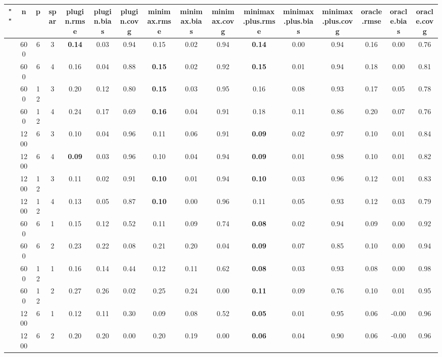 \begin{table}[ht]
\centering
\begin{tabular}{||c|ccc||ccc|ccc|ccc|ccc}
  \hline
\hline
"" & n & p & spar & plugin.rmse & plugin.bias & plugin.covg & minimax.rmse & minimax.bias & minimax.covg & minimax.plus.rmse & minimax.plus.bias & minimax.plus.covg & oracle.rmse & oracle.bias & oracle.covg \\ 
  \hline
 & 600 & 6 & 3 & \bf 0.14 & 0.03 & 0.94 & 0.15 & 0.02 & 0.94 & \bf 0.14 & 0.00 & 0.94 & 0.16 & 0.00 & 0.76 \\ 
   & 600 & 6 & 4 & 0.16 & 0.04 & 0.88 & \bf 0.15 & 0.02 & 0.92 & \bf 0.15 & 0.01 & 0.94 & 0.18 & 0.00 & 0.81 \\ 
   & 600 & 12 & 3 & 0.20 & 0.12 & 0.80 & \bf 0.15 & 0.03 & 0.95 & 0.16 & 0.08 & 0.93 & 0.17 & 0.05 & 0.78 \\ 
   & 600 & 12 & 4 & 0.24 & 0.17 & 0.69 & \bf 0.16 & 0.04 & 0.91 & 0.18 & 0.11 & 0.86 & 0.20 & 0.07 & 0.76 \\ 
   & 1200 & 6 & 3 & 0.10 & 0.04 & 0.96 & 0.11 & 0.06 & 0.91 & \bf 0.09 & 0.02 & 0.97 & 0.10 & 0.01 & 0.84 \\ 
   & 1200 & 6 & 4 & \bf 0.09 & 0.03 & 0.96 & 0.10 & 0.04 & 0.94 & \bf 0.09 & 0.01 & 0.98 & 0.10 & 0.01 & 0.82 \\ 
   & 1200 & 12 & 3 & 0.11 & 0.02 & 0.91 & \bf 0.10 & 0.01 & 0.94 & \bf 0.10 & 0.03 & 0.96 & 0.12 & 0.01 & 0.83 \\ 
   & 1200 & 12 & 4 & 0.13 & 0.05 & 0.87 & \bf 0.10 & 0.00 & 0.96 & 0.11 & 0.05 & 0.93 & 0.12 & 0.03 & 0.79 \\ 
   \hline
 & 600 & 6 & 1 & 0.15 & 0.12 & 0.52 & 0.11 & 0.09 & 0.74 & \bf 0.08 & 0.02 & 0.94 & 0.09 & 0.00 & 0.92 \\ 
   & 600 & 6 & 2 & 0.23 & 0.22 & 0.08 & 0.21 & 0.20 & 0.04 & \bf 0.09 & 0.07 & 0.85 & 0.10 & 0.00 & 0.94 \\ 
   & 600 & 12 & 1 & 0.16 & 0.14 & 0.44 & 0.12 & 0.11 & 0.62 & \bf 0.08 & 0.03 & 0.93 & 0.08 & 0.00 & 0.98 \\ 
   & 600 & 12 & 2 & 0.27 & 0.26 & 0.02 & 0.25 & 0.24 & 0.00 & \bf 0.11 & 0.09 & 0.76 & 0.10 & 0.01 & 0.95 \\ 
   & 1200 & 6 & 1 & 0.12 & 0.11 & 0.30 & 0.09 & 0.08 & 0.52 & \bf 0.05 & 0.01 & 0.95 & 0.06 & -0.00 & 0.96 \\ 
   & 1200 & 6 & 2 & 0.20 & 0.20 & 0.00 & 0.20 & 0.19 & 0.00 & \bf 0.06 & 0.04 & 0.90 & 0.06 & -0.00 & 0.96 \\ 

\end{tabular}
\end{table}

